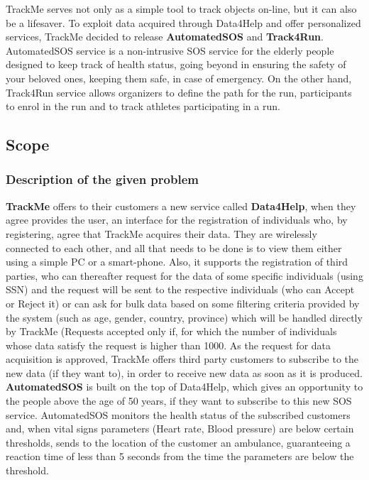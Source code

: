 \documentclass[12pt]{article}
\begin{document}
TrackMe serves not only as a simple tool to track objects on-line, but it can also be a lifesaver. To exploit data acquired through Data4Help and offer personalized services, TrackMe decided to release \textbf{AutomatedSOS} and \textbf{Track4Run}. AutomatedSOS service is a non-intrusive SOS service for the elderly people designed to keep track of health status, going beyond in ensuring the safety of your beloved ones, keeping them safe, in case of emergency. On the other hand, Track4Run service allows organizers to define the path for the run, participants to enrol in the run and to track athletes participating in a run.\\

\subsection{Scope}

\subsubsection{Description of the given problem}
\textbf{TrackMe} offers to their customers a new service called \textbf{Data4Help}, when they agree provides the user, an interface for the registration of individuals who, by registering, agree that TrackMe acquires their data. They are wirelessly connected to each other, and all that needs to be done is to view them either using a simple PC or a smart-phone. Also, it supports the registration of third parties, who can thereafter request for the data of some specific individuals (using SSN) and the request will be sent to the respective individuals (who can Accept or Reject it) or can ask for bulk data based on some filtering criteria provided by the system (such as age, gender, country, province) which will be handled directly by TrackMe (Requests accepted only if, for which the number of individuals whose data satisfy the request is higher than 1000. As the request for data acquisition is approved, TrackMe offers third party customers to subscribe to the new data (if they want to), in order to receive new data as soon as it is produced.\\

\textbf{AutomatedSOS} is built on the top of Data4Help, which gives an opportunity to the people above the age of 50 years, if they want to subscribe to this new SOS service. AutomatedSOS monitors the health status of the subscribed customers and, when vital signs parameters (Heart rate, Blood pressure) are below certain thresholds, sends to the location of the customer an ambulance, guaranteeing a reaction time of less than 5 seconds from the time the parameters	are	below the threshold.\\
\end{document}
